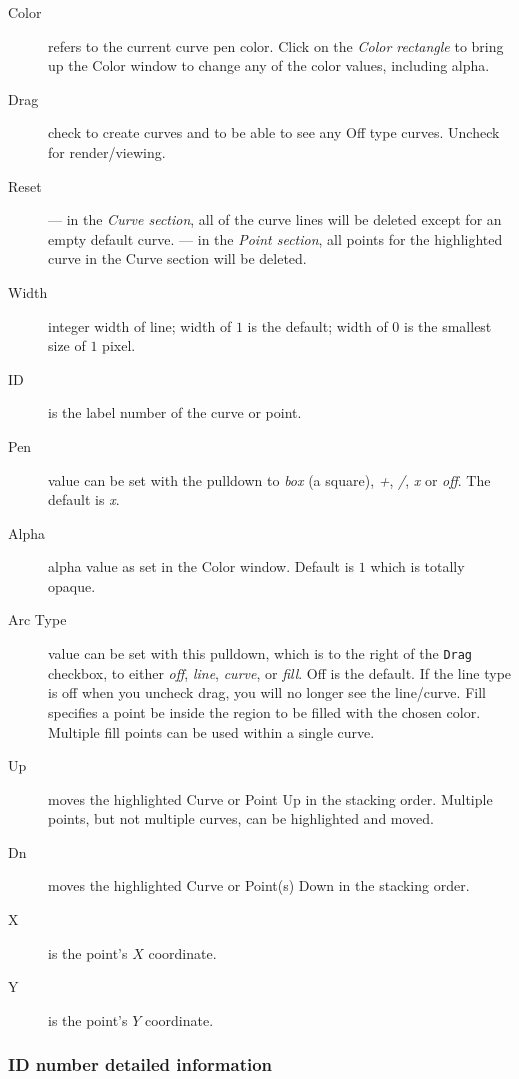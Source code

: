 \begin{description}
    \item[Color] refers to the current curve pen color. Click on the \textit{Color rectangle} to bring up the Color window to change any of the color values, including alpha.
    \item[Drag] check to create curves and to be able to see any Off type curves. Uncheck for render/viewing.
    \item[Reset] --- in the \textit{Curve section}, all of the curve lines will be deleted except for an empty default curve.
    --- in the \textit{Point section}, all points for the highlighted curve in the Curve section will be deleted.
    \item[Width] integer width of line; width of $1$ is the default; width of $0$ is the smallest size of $1$ pixel.
    \item[ID] is the label number of the curve or point.
    \item[Pen] value can be set with the pulldown to \textit{box} (a square), \textit{+}, \textit{/}, \textit{x} or \textit{off}. The default is \textit{x}.
    \item[Alpha] alpha value as set in the Color window. Default is $1$ which is totally opaque.
    \item[Arc Type] value can be set with this pulldown, which is to the right of the \texttt{Drag} checkbox, to either \textit{off}, \textit{line}, \textit{curve}, or \textit{fill}. Off is the default. If the line type is off when you uncheck drag, you will no longer see the line/curve. Fill specifies a point be inside the region to be filled with the chosen color. Multiple fill points can be used within a single curve.
    \item[Up] moves the highlighted Curve or Point Up in the stacking order. Multiple points, but not multiple curves, can be highlighted and moved.
    \item[Dn] moves the highlighted Curve or Point(s) Down in the stacking order.
    \item[X] is the point’s $X$ coordinate.
    \item[Y] is the point’s $Y$ coordinate.
\end{description}

\subsubsection*{ID number detailed information}%
\label{ssub:id_number_detailed_information}

